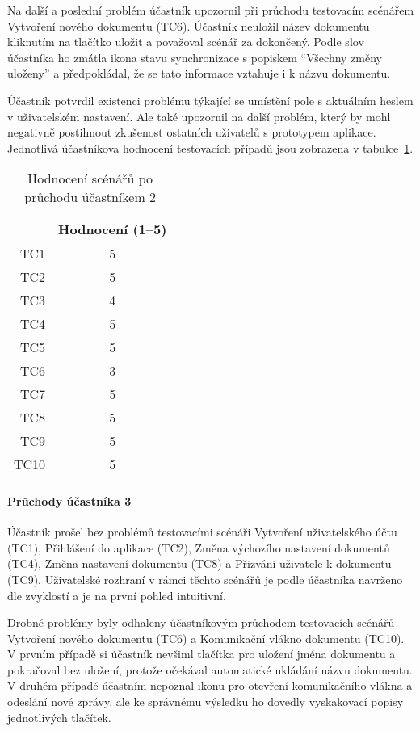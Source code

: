 Na další a poslední problém účastník upozornil při průchodu testovacím scénářem Vytvoření nového dokumentu (TC6).
Účastník neuložil název dokumentu kliknutím na tlačítko uložit a považoval scénář za dokončený.
Podle slov účastníka ho zmátla ikona stavu synchronizace s popiskem \enquote{Všechny změny uloženy} a předpokládal, že se tato informace vztahuje i k názvu dokumentu.

Účastník potvrdil existenci problému týkající se umístění pole s aktuálním heslem v uživatelském nastavení.
Ale také upozornil na další problém, který by mohl negativně postihnout zkušenost ostatních uživatelů s prototypem aplikace.
Jednotlivá účastníkova hodnocení testovacích případů jsou zobrazena v tabulce~\ref{tab:poPrůchoduÚčastníkem2}.

\begin{table}[ht!]
    \centering
    \caption{Hodnocení scénářů po průchodu účastníkem 2}
    \label{tab:poPrůchoduÚčastníkem2}
    \begin{tabular}{r|c}
        & Hodnocení (1--5) \\ \hline
        TC1 & 5 \\
        TC2 & 5 \\
        TC3 & 4 \\
        TC4 & 5 \\
        TC5 & 5 \\
        TC6 & 3 \\
        TC7 & 5 \\
        TC8 & 5 \\
        TC9 & 5 \\
        TC10 & 5 \\
    \end{tabular}
\end{table}

\paragraph{Průchody účastníka 3}

Účastník prošel bez problémů testovacími scénáři Vytvoření uživatelského účtu (TC1), Přihlášení do aplikace (TC2), Změna výchozího nastavení dokumentů (TC4), Změna nastavení dokumentu (TC8) a Přizvání uživatele k dokumentu (TC9).
Uživatelské rozhraní v rámci těchto scénářů je podle účastníka navrženo dle zvyklostí a je na první pohled intuitivní.

Drobné problémy byly odhaleny účastníkovým průchodem testovacích scénářů Vytvoření nového dokumentu (TC6) a Komunikační vlákno dokumentu (TC10).
V prvním případě si účastník nevšiml tlačítka pro uložení jména dokumentu a pokračoval bez uložení, protože očekával automatické ukládání názvu dokumentu.
V druhém případě účastním nepoznal ikonu pro otevření komunikačního vlákna a odeslání nové zprávy, ale ke správnému výsledku ho dovedly vyskakovací popisy jednotlivých tlačítek.

